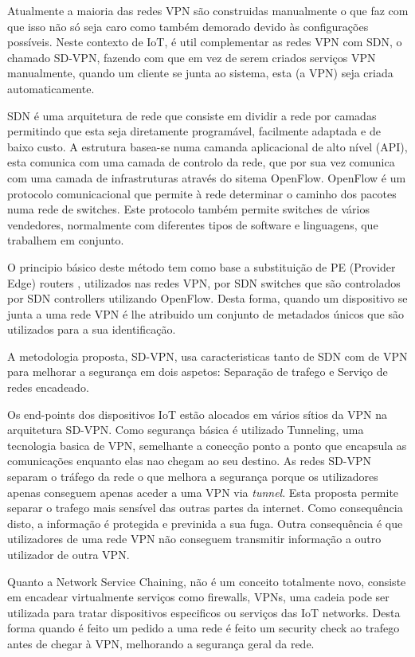 \documentclass{llncs}
\begin{document}
Atualmente a maioria  das redes VPN são construidas manualmente o que faz com que isso não só seja caro como também demorado devido às configurações possíveis. Neste contexto de IoT, é util complementar as redes VPN com SDN, o chamado SD-VPN, fazendo com que em vez de serem criados serviços VPN manualmente, quando um cliente se junta ao sistema, esta (a VPN) seja criada automaticamente.\cite{Linda} \par
SDN é uma arquitetura de rede que consiste em dividir a rede por camadas permitindo que esta seja diretamente programável, facilmente adaptada e de baixo custo. A estrutura basea-se numa camanda aplicacional de alto nível (API), esta comunica com uma camada de controlo da rede, que por sua vez comunica com uma camada de infrastruturas através do sitema OpenFlow. OpenFlow é um protocolo comunicacional que permite à rede determinar o caminho dos pacotes numa rede de switches. Este protocolo também permite switches de vários vendedores, normalmente com diferentes tipos de software e linguagens, que trabalhem em conjunto.\par
O principio básico deste método tem como base a substituição de PE (Provider Edge) routers , utilizados nas redes VPN, por SDN switches que são controlados por SDN controllers utilizando OpenFlow. Desta forma, quando um dispositivo se junta a uma rede VPN é lhe atribuido um conjunto  de metadados únicos que são utilizados para a sua identificação.\par
A metodologia proposta, SD-VPN, usa caracteristicas tanto de SDN com de VPN para melhorar a segurança em dois aspetos: Separação de trafego e Serviço de redes encadeado.\cite{Mirk}\par
Os end-points dos dispositivos IoT estão alocados em vários sítios da VPN na arquitetura SD-VPN. Como segurança básica é utilizado Tunneling, uma tecnologia basica de VPN, semelhante a conecção ponto a ponto que encapsula as comunicações enquanto elas nao chegam ao seu destino. As redes SD-VPN separam o tráfego da rede o que melhora a segurança porque os utilizadores apenas conseguem apenas aceder a uma VPN via \textit{tunnel}. Esta proposta permite separar o trafego mais sensível das outras partes da internet. Como consequência disto, a informação é protegida e previnida a sua fuga. Outra consequência é que utilizadores de uma rede VPN não conseguem transmitir informação a outro utilizador de outra VPN.\par Quanto a Network Service Chaining, não é um conceito totalmente novo, consiste em encadear virtualmente serviços como firewalls, VPNs, uma cadeia pode ser utilizada para tratar dispositivos especificos ou serviços das IoT networks. Desta forma quando é feito um pedido a uma rede é feito um security check ao trafego antes de chegar à VPN, melhorando a segurança geral da rede.\cite{Linda}
\end{document}
